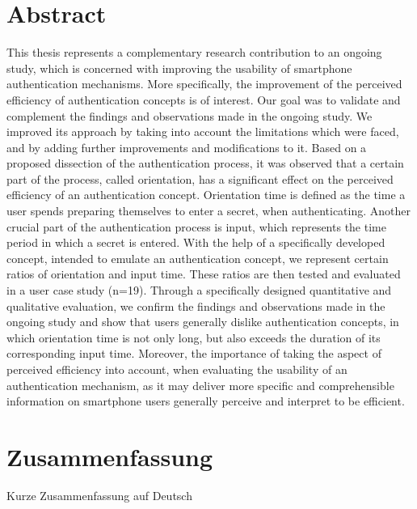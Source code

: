 \begingroup
\let\clearpage\relax
\let\cleardoublepage\relax
\let\cleardoublepage\relax

\chapter*{Abstract}
This thesis represents a complementary research contribution to an ongoing study, which is concerned with improving the usability of smartphone authentication mechanisms. More specifically, the improvement of the perceived efficiency of authentication concepts is of interest. Our goal was to validate and complement the findings and observations made in the ongoing study. We improved its approach by taking into account the limitations which were faced, and by adding further improvements and modifications to it. Based on a proposed dissection of the authentication process, it was observed that a certain part of the process, called orientation, has a significant effect on the perceived efficiency of an authentication concept. Orientation time is defined as the time a user spends preparing themselves to enter a secret, when authenticating. Another crucial part of the authentication process is input, which represents the time period in which a secret is entered. With the help of a specifically developed concept, intended to emulate an authentication concept, we represent certain ratios of orientation and input time. These ratios are then tested and evaluated in a user case study (n=19). Through a specifically designed quantitative and qualitative evaluation, we confirm the findings and observations made in the ongoing study and show that users generally dislike authentication concepts, in which orientation time is not only long, but also exceeds the duration of its corresponding input time. Moreover, the importance of taking the aspect of perceived efficiency into account, when evaluating the usability of an authentication mechanism, as it may deliver more specific and comprehensible information on smartphone users generally perceive and interpret to be efficient. 

\vfill

\chapter*{Zusammenfassung}
Kurze Zusammenfassung auf Deutsch


\endgroup			

\vfill 